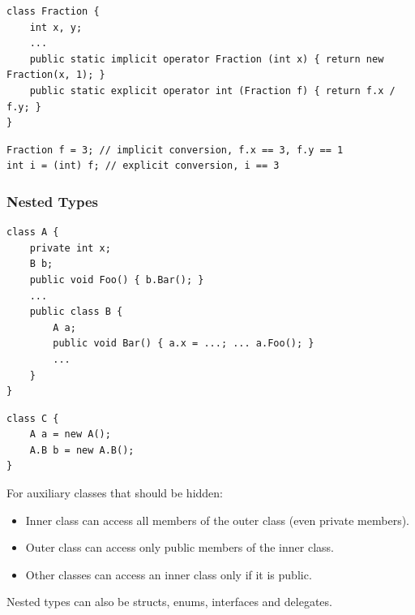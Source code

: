 \begin{lstlisting}
class Fraction {
	int x, y;
	...
	public static implicit operator Fraction (int x) { return new Fraction(x, 1); }
	public static explicit operator int (Fraction f) { return f.x / f.y; }
}
\end{lstlisting}

\begin{lstlisting}
Fraction f = 3; // implicit conversion, f.x == 3, f.y == 1
int i = (int) f; // explicit conversion, i == 3
\end{lstlisting}

\subsubsection{Nested Types}
\begin{multicols}{2}
\begin{lstlisting}
class A {
	private int x;
	B b;
	public void Foo() { b.Bar(); }
	...
	public class B {
		A a;
		public void Bar() { a.x = ...; ... a.Foo(); }
		...
	}
}
\end{lstlisting}
\columnbreak
\begin{lstlisting}
class C {
	A a = new A();
	A.B b = new A.B();
}
\end{lstlisting}
\end{multicols}

For auxiliary classes that should be hidden:
\begin{itemize}
	\item Inner class can access all members of the outer class (even private members).
	\item Outer class can access only public members of the inner class.
	\item Other classes can access an inner class only if it is public.
\end{itemize}
Nested types can also be structs, enums, interfaces and delegates.


